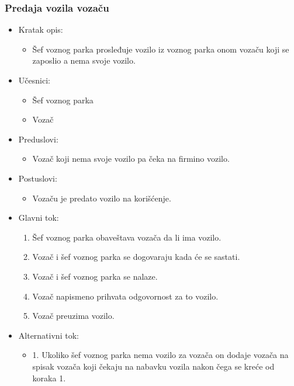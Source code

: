 \subsubsection{\bfseries Predaja vozila vozaču}
\begin{itemize}
	\item Kratak opis:
		\begin{itemize}
			\item Šef voznog parka prosleđuje vozilo iz voznog parka onom vozaču koji se zaposlio a nema svoje vozilo.
		\end{itemize}

	\item Učesnici:
		\begin{itemize}
		    \item Šef voznog parka
			\item Vozač
		\end{itemize}


	\item Preduslovi:
		\begin{itemize}
		    \item Vozač koji nema svoje vozilo pa čeka na firmino vozilo.
		\end{itemize}


	\item Postuslovi:
		\begin{itemize}
			\item Vozaču je predato vozilo na korišćenje.
	\end{itemize}

	\item Glavni tok:
		\begin{enumerate}
		    \item Šef voznog parka obaveštava vozača da li ima vozilo.
		    \item Vozač i šef voznog parka se dogovaraju kada će se sastati.
		    \item Vozač i šef voznog parka se nalaze.
			\item Vozač napismeno prihvata odgovornost za to vozilo.
			\item Vozač preuzima vozilo.
		\end{enumerate}

	\item Alternativni tok:
		\begin{itemize}
		    \item 1. Ukoliko šef voznog parka nema vozilo za vozača on dodaje vozača na spisak vozača koji čekaju na nabavku vozila nakon čega se kreće od koraka 1.
		\end{itemize}

\end{itemize}

